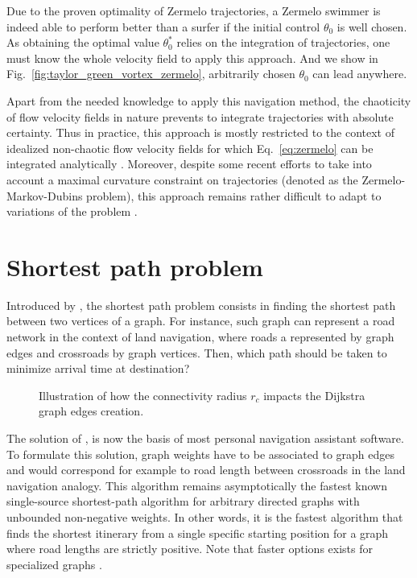 Due to the proven optimality of Zermelo trajectories, a Zermelo swimmer is indeed able to perform better than a surfer if the initial control $\theta_0$ is well chosen.
As obtaining the optimal value $\theta_0^*$ relies on the integration of trajectories, one must know the whole velocity field to apply this approach.
And we show in Fig.~\ref{fig:taylor_green_vortex_zermelo}, arbitrarily chosen $\theta_0$ can lead anywhere.

Apart from the needed knowledge to apply this navigation method, the chaoticity of flow velocity fields in nature prevents to integrate trajectories with absolute certainty.
Thus in practice, this approach is mostly restricted to the context of idealized non-chaotic flow velocity fields for which Eq.~\eqref{eq:zermelo} can be integrated analytically \citep{liebchen2019optimal}.
Moreover, despite some recent efforts to take into account a maximal curvature constraint on trajectories (denoted as the Zermelo-Markov-Dubins problem), this approach remains rather difficult to adapt to variations of the problem \citep{caillau2019zermelo, sacchelli2021zermelo}.

\section{Shortest path problem}\label{sec:shortest_path}

Introduced by \citet{dijkstra1959note}, the shortest path problem consists in finding the shortest path between two vertices of a graph.
For instance, such graph can represent a road network in the context of land navigation, where roads a represented by graph edges and crossroads by graph vertices.
Then, which path should be taken to minimize arrival time at destination?
\begin{figure}
	\centering
	\def\svgwidth{0.8\textwidth}
	
  	\caption{
  		Illustration of how the connectivity radius $r_c$ impacts the Dijkstra graph edges creation.
  	}
  	\label{fig:dijkstra_edges}
\end{figure}

The solution of \citet{dijkstra1959note}, is now the basis of most personal navigation assistant software.
To formulate this solution, graph weights have to be associated to graph edges and would correspond for example to road length between crossroads in the land navigation analogy.
This algorithm remains asymptotically the fastest known single-source shortest-path algorithm for arbitrary directed graphs with unbounded non-negative weights.
In other words, it is the fastest algorithm that finds the shortest itinerary from a single specific starting position for a graph where road lengths are strictly positive.
Note that faster options exists for specialized graphs \citep{dial1969algorithm, thorup2000ram}.

